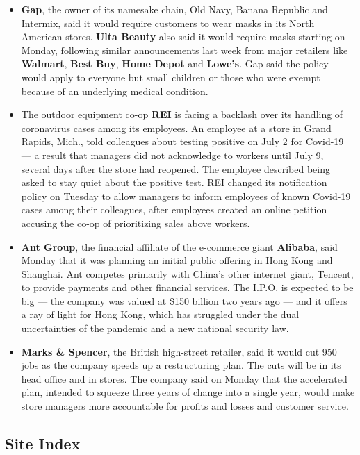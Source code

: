 \begin{itemize}
\item
  \textbf{Gap}, the owner of its namesake chain, Old Navy, Banana
  Republic and Intermix, said it would require customers to wear masks
  in its North American stores. \textbf{Ulta Beauty} also said it would
  require masks starting on Monday, following similar announcements last
  week from major retailers like \textbf{Walmart}, \textbf{Best Buy},
  \textbf{Home Depot} and \textbf{Lowe's}. Gap said the policy would
  apply to everyone but small children or those who were exempt because
  of an underlying medical condition.
\item
  The outdoor equipment co-op \textbf{REI}
  \href{https://www.nytimes.com/2020/07/19/business/coronavirus-rei-staff.html}{is
  facing a backlash} over its handling of coronavirus cases among its
  employees. An employee at a store in Grand Rapids, Mich., told
  colleagues about testing positive on July 2 for Covid-19 --- a result
  that managers did not acknowledge to workers until July 9, several
  days after the store had reopened. The employee described being asked
  to stay quiet about the positive test. REI changed its notification
  policy on Tuesday to allow managers to inform employees of known
  Covid-19 cases among their colleagues, after employees created an
  online petition accusing the co-op of prioritizing sales above
  workers.
\item
  \textbf{Ant Group}, the financial affiliate of the e-commerce giant
  \textbf{Alibaba}, said Monday that it was planning an initial public
  offering in Hong Kong and Shanghai. Ant competes primarily with
  China's other internet giant, Tencent, to provide payments and other
  financial services. The I.P.O. is expected to be big --- the company
  was valued at \$150 billion two years ago --- and it offers a ray of
  light for Hong Kong, which has struggled under the dual uncertainties
  of the pandemic and a new national security law.
\item
  \textbf{Marks \& Spencer}, the British high-street retailer, said it
  would cut 950 jobs as the company speeds up a restructuring plan. The
  cuts will be in its head office and in stores. The company said on
  Monday that the accelerated plan, intended to squeeze three years of
  change into a single year, would make store managers more accountable
  for profits and losses and customer service.
\end{itemize}

\hypertarget{site-index}{%
\subsection{Site Index}\label{site-index}}

